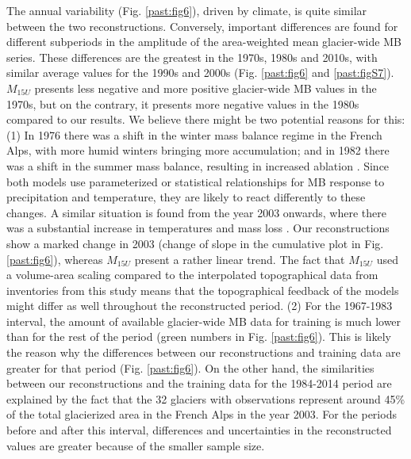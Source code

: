 The annual variability (Fig. \ref{past:fig6}), driven by climate, is quite similar between the two reconstructions. Conversely, important differences are found for different subperiods in the amplitude of the area-weighted mean glacier-wide MB series. These differences are the greatest in the 1970s, 1980s and 2010s, with similar average values for the 1990s and 2000s (Fig. \ref{past:fig6} and \ref{past:figS7}). $M_{15U}$ presents less negative and more positive glacier-wide MB values in the 1970s, but on the contrary, it presents more negative values in the 1980s compared to our results. We believe there might be two potential reasons for this: (1) In 1976 there was a shift in the winter mass balance regime in the French Alps, with more humid winters bringing more accumulation; and in 1982 there was a shift in the summer mass balance, resulting in increased ablation \citep{thibert_climatic_2013}. Since both models use parameterized or statistical relationships for MB response to precipitation and temperature, they are likely to react differently to these changes. A similar situation is found from the year 2003 onwards, where there was a substantial increase in temperatures and mass loss \citep[e.g.][]{six_sensitivity_2014}. Our reconstructions show a marked change in 2003 (change of slope in the cumulative plot in Fig. \ref{past:fig6}), whereas $M_{15U}$ present a rather linear trend. The fact that $M_{15U}$ used a volume-area scaling compared to the interpolated topographical data from inventories from this study means that the topographical feedback of the models might differ as well throughout the reconstructed period. (2) For the 1967-1983 interval, the amount of available glacier-wide MB data for training is much lower than for the rest of the period (green numbers in Fig. \ref{past:fig6}). This is likely the reason why the differences between our reconstructions and training data are greater for that period (Fig. \ref{past:fig6}). On the other hand, the similarities between our reconstructions and the training data for the 1984-2014 period are explained by the fact that the 32 glaciers with observations represent around 45\% of the total glacierized area in the French Alps in the year 2003. For the periods before and after this interval, differences and uncertainties in the reconstructed values are greater because of the smaller sample size.

